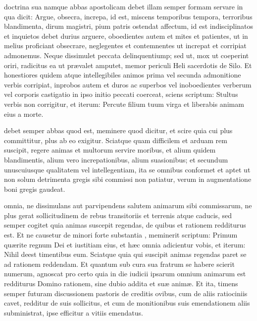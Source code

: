 \documentclass[fontsize=9pt,paper=A6,twoside,BCOR=1mm,DIV=22,headinclude]{scrarticle}
\begin{document}
\begin{multicols}{2}

 doctrina sua namque abbas apostolicam debet illam semper formam servare in qua dicit: Argue, obsecra, increpa, id est, miscens temporibus tempora, terroribus blandimenta, dirum magistri, pium patris ostendat affectum, id est indisciplinatos et inquietos debet durius arguere, oboedientes autem et mites et patientes, ut in melius proficiant obsecrare, neglegentes et contemnentes ut increpat et corripiat admonemus. Neque dissimulet peccata delinquentiump; sed ut, mox ut coeperint oriri, radicitus ea ut prævalet amputet, memor periculi Heli sacerdotis de Silo. Et honestiores quidem atque intellegibiles animos prima vel secunda admonitione verbis corripiat, inprobos autem et duros ac superbos vel inoboedientes verberum vel corporis castigatio in ipso initio peccati coerceat, sciens scriptum: Stultus verbis non corrigitur, et iterum: Percute filium tuum virga et liberabis animam eius a morte.


 debet semper abbas quod est, meminere quod dicitur, et scire quia cui plus committitur, plus ab eo exigitur. Sciatque quam difficilem et arduam rem suscipit, regere animas et multorum servire moribus, et alium quidem blandimentis, alium vero increpationibus, alium suasionibus; et secundum unuscuiusque qualitatem vel intellegentiam, ita se omnibus conformet et aptet ut non solum detrimenta gregis sibi commissi non patiatur, verum in augmentatione boni gregis gaudeat.


 omnia, ne dissimulans aut parvipendens salutem animarum sibi commissarum, ne plus gerat sollicitudinem de rebus transitoriis et terrenis atque caducis, sed semper cogitet quia animas suscepit regendas, de quibus et rationem redditurus est. Et ne causetur de minori forte substantia , meminerit scriptum: Primum quærite regnum Dei et iustitiam eius, et hæc omnia adicientur vobis, et iterum: Nihil deest timentibus eum. Sciatque quia qui suscipit animas regendas paret se ad rationem reddendam. Et quantum sub cura sua fratrum se habere scierit numerum, agnoscat pro certo quia in die iudicii ipsarum omnium animarum est redditurus Domino rationem, sine dubio addita et suæ animæ. Et ita, timens semper futuram discussionem pastoris de creditis ovibus, cum de aliis ratiociniis cavet, redditur de suis sollicitus, et cum de monitionibus suis emendationem aliis subministrat, ipse efficitur a vitiis emendatus. 


\end{multicols}
\end{document}
